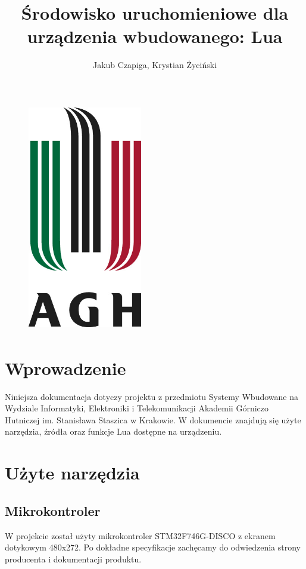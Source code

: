\documentclass{article}
\author{Jakub Czapiga, Krystian Życiński}
\title{Środowisko uruchomieniowe dla urządzenia wbudowanego: Lua}
\begin{document}
\begin{figure}[t]
    \includegraphics[width=5cm, height=10cm]{agh.jpg}
    \centering
\end{figure}

\maketitle

\pagebreak

\section{Wprowadzenie}

Niniejsza dokumentacja dotyczy projektu z przedmiotu Systemy Wbudowane na Wydziale Informatyki, Elektroniki i Telekomunikacji Akademii
Górniczo Hutniczej im. Stanisława Staszica w Krakowie. W dokumencie znajdują się użyte narzędzia, źródła oraz funkcje Lua dostępne na
urządzeniu. 

\section{Użyte narzędzia}

\subsection{Mikrokontroler}

W projekcie został użyty mikrokontroler STM32F746G-DISCO z ekranem dotykowym 480x272. Po dokładne specyfikacje zachęcamy do odwiedzenia 
strony producenta i dokumentacji produktu.
\end{document}
